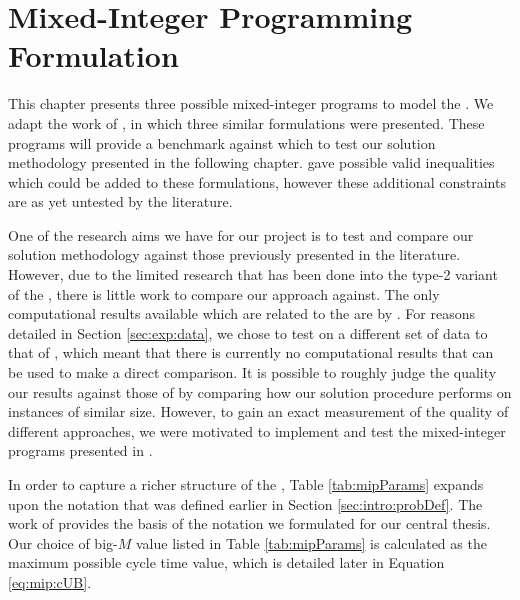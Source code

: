 

\chapter{Mixed-Integer Programming Formulation}
\label{chap:mip}
This chapter presents three possible mixed-integer programs to model
the .
We adapt the work of , in which
three similar formulations were presented.
These programs will provide a benchmark against which
to test our solution methodology presented in the following
chapter.
\citeauthor{Esmaeilbeigi2016} gave possible valid inequalities
which could be added to these formulations, however these 
additional constraints are as yet untested by the literature.

One of the research aims we have for our project is to test and compare
our solution methodology against those previously presented
in the literature.
However, due to the limited research that has
been done into the type-2 variant of the \sua{}, there is little
work to compare our approach against.
The only computational results available which are related to the
 are by .
For reasons detailed in Section \ref{sec:exp:data}, we chose to test
on a different set of data to that of \citeauthor{Yolmeh2012},
which meant that there is currently no computational
results that can be used to make a direct comparison.
It is possible to roughly judge the quality our results against those of \citeauthor{Yolmeh2012}
by comparing how our solution procedure performs on instances
of similar size.
However, to gain an exact measurement of the quality of different
approaches, we were motivated to implement and test the mixed-integer programs presented
in \citeauthor{Esmaeilbeigi2016}.

In order to capture a richer structure of the \sua{},
Table \ref{tab:mipParams} expands upon the notation that was defined earlier in 
Section \ref{sec:intro:probDef}. The work of \citeauthor{Esmaeilbeigi2016}
provides the basis of the notation we formulated for our central thesis.
Our choice of big-$M$ value listed in Table \ref{tab:mipParams} 
is calculated as the maximum possible cycle time value, 
which is detailed later in Equation \ref{eq:mip:cUB}.

